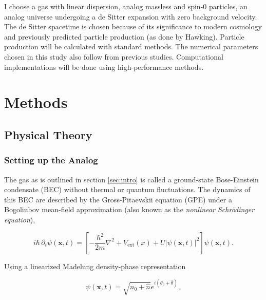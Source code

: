 \documentclass{article}
\begin{document}
    I choose a gas with linear dispersion, analog massless and spin-0 particles, an analog universe undergoing a de Sitter expansion with zero background velocity.  The de Sitter spacetime is chosen because of its significance to modern cosmology and previously predicted particle production (as done by Hawking)\cite{de_Sitter_inhomogeneities, de_Sitter_particle_production_1, de_Sitter_particle_production_2}. Particle production will be calculated with standard methods\cite{particle_production_1, particle_production_2}.  The numerical parameters chosen in this study also follow from previous studies\cite{parameters}.  Computational implementations will be done using high-performance methods.

\section{Methods}

    \subsection{Physical Theory}

        \subsubsection{Setting up the Analog}

            The gas as is outlined in section \ref{sec:intro} is called a ground-state Bose-Einstein condensate (BEC) without thermal or quantum fluctuations. The dynamics of this BEC are described by the Gross-Pitaevskii equation (GPE) under a Bogoliubov mean-field approximation (also known as the \textit{nonlinear Schr{\"o}dinger equation}),
            
            \begin{equation} \label{eq:GPE}
                i \hbar \, \partial_t \psi(\mathbf{x}, t) = \left[ -\frac{\hbar^2}{2 m} \nabla^2 + V_\text{ext}(x) + U \left| \psi(\mathbf{x}, t) \right|^2 \right] \psi(\mathbf{x}, t).
            \end{equation}
            
            Using a linearized Madelung density-phase representation

            \begin{equation} \label{eq:Madelung}
                \psi(\mathbf{x}, t) = \sqrt{n_0 + \hat{n}} e^{i \left( \theta_0 + \hat{\theta} \right)},
            \end{equation}
\end{document}
